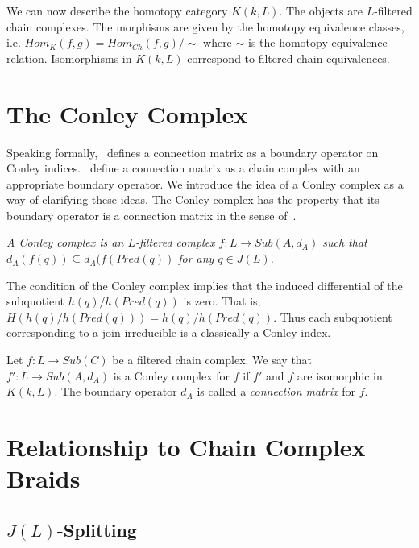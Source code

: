 We can now describe the homotopy category $K(k,L)$.  The objects are $L$-filtered chain complexes.  The morphisms are given by the homotopy equivalence classes, i.e. $Hom_K(f,g) = Hom_{Ch}(f,g)/\sim$ where $\sim$ is the homotopy equivalence relation.   Isomorphisms in $K(k,L)$ correspond to filtered chain equivalences.




\section{The Conley Complex}

Speaking formally,~\cite{fran} defines a connection matrix as a boundary operator on Conley indices.~\cite{salamon} define a connection matrix as a chain complex with an appropriate boundary operator.    We introduce the idea of a Conley complex as a way of clarifying these ideas.  The Conley complex has the property that its boundary operator is a connection matrix in the sense of~\cite{fran}.   

\begin{defn}
{\em A Conley complex is an $L$-filtered complex $f:L\to Sub(A,d_A)$ such that $d_A(f(q))\subseteq d_A(f(Pred(q))$ for any $q\in J(L)$.
}
\end{defn}

The condition of the Conley complex implies that the induced differential of the subquotient $h(q)/h(Pred(q))$ is zero.  That is, $H(h(q)/h(Pred(q))) = h(q)/h(Pred(q))$.   Thus each subquotient corresponding to a join-irreducible is a classically a Conley index.  



Let $f:L\to Sub(C)$ be a filtered chain complex.  We say that $f':L\to Sub(A,d_A)$ is a Conley complex for $f$ if $f'$ and $f$ are isomorphic in $K(k,L)$.  The boundary operator $d_A$ is called a {\em connection matrix} for $f$. 



\section{Relationship to Chain Complex Braids}

\subsection{$J(L)$-Splitting}

